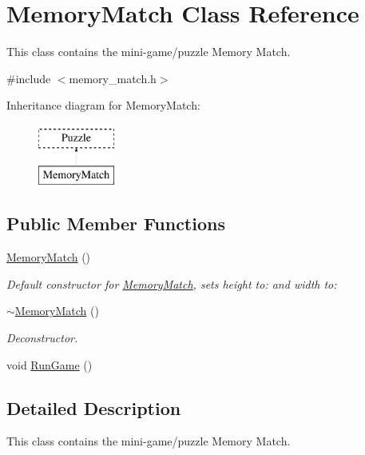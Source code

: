 \hypertarget{classMemoryMatch}{\section{Memory\-Match Class Reference}
\label{classMemoryMatch}
}


This class contains the mini-\/game/puzzle Memory Match.  




{\ttfamily \#include $<$memory\-\_\-match.\-h$>$}

Inheritance diagram for Memory\-Match\-:\begin{figure}[H]
\begin{center}
\leavevmode
\includegraphics[height=2.000000cm]{classMemoryMatch}
\end{center}
\end{figure}
\subsection*{Public Member Functions}
\begin{DoxyCompactItemize}
\item 
\hyperlink{classMemoryMatch_a7221a0b7d33bf079df51c1f7f52aa2dd}{Memory\-Match} ()
\begin{DoxyCompactList}\small\item\em Default constructor for \hyperlink{classMemoryMatch}{Memory\-Match}, sets height to\-: and width to\-: \end{DoxyCompactList}\item 
\hypertarget{classMemoryMatch_a1b2cf5418b2b26e21b4fd12d880e79b7}{\hyperlink{classMemoryMatch_a1b2cf5418b2b26e21b4fd12d880e79b7}{$\sim$\-Memory\-Match} ()}\label{classMemoryMatch_a1b2cf5418b2b26e21b4fd12d880e79b7}

\begin{DoxyCompactList}\small\item\em Deconstructor. \end{DoxyCompactList}\item 
void \hyperlink{classMemoryMatch_a3973ebb1ab8d44a51bd629bc3b0df370}{Run\-Game} ()
\end{DoxyCompactItemize}


\subsection{Detailed Description}
This class contains the mini-\/game/puzzle Memory Match. 

